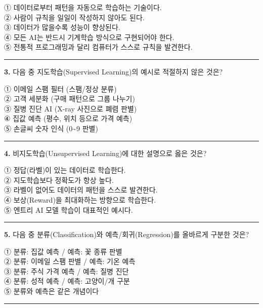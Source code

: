 \documentclass[a4paper, 11pt]{article}
\begin{document}
① 데이터로부터 패턴을 자동으로 학습하는 기술이다.\\
② 사람이 규칙을 일일이 작성하지 않아도 된다.\\
③ 데이터가 많을수록 성능이 향상된다.\\
④ 모든 AI는 반드시 기계학습 방식으로 구현되어야 한다.\\
⑤ 전통적 프로그래밍과 달리 컴퓨터가 스스로 규칙을 발견한다.

\begin{center}\rule{0.5\linewidth}{0.5pt}\end{center}

\textbf{3.} 다음 중 지도학습(Supervised Learning)의 예시로 적절하지 않은
것은?

① 이메일 스팸 필터 (스팸/정상 분류)\\
② 고객 세분화 (구매 패턴으로 그룹 나누기)\\
③ 질병 진단 AI (X-ray 사진으로 폐렴 판별)\\
④ 집값 예측 (평수, 위치 등으로 가격 예측)\\
⑤ 손글씨 숫자 인식 (0\textasciitilde9 판별)

\begin{center}\rule{0.5\linewidth}{0.5pt}\end{center}

\textbf{4.} 비지도학습(Unsupervised Learning)에 대한 설명으로 옳은 것은?

① 정답(라벨)이 있는 데이터로 학습한다.\\
② 지도학습보다 정확도가 항상 높다.\\
③ 라벨이 없어도 데이터의 패턴을 스스로 발견한다.\\
④ 보상(Reward)을 최대화하는 방향으로 학습한다.\\
⑤ 엔트리 AI 모델 학습이 대표적인 예시다.

\begin{center}\rule{0.5\linewidth}{0.5pt}\end{center}

\textbf{5.} 다음 중 분류(Classification)와 예측/회귀(Regression)를
올바르게 구분한 것은?

① 분류: 집값 예측 / 예측: 꽃 종류 판별\\
② 분류: 이메일 스팸 판별 / 예측: 기온 예측\\
③ 분류: 주식 가격 예측 / 예측: 질병 진단\\
④ 분류: 성적 예측 / 예측: 고양이/개 구분\\
⑤ 분류와 예측은 같은 개념이다

\begin{center}\rule{0.5\linewidth}{0.5pt}\end{center}
\end{document}
